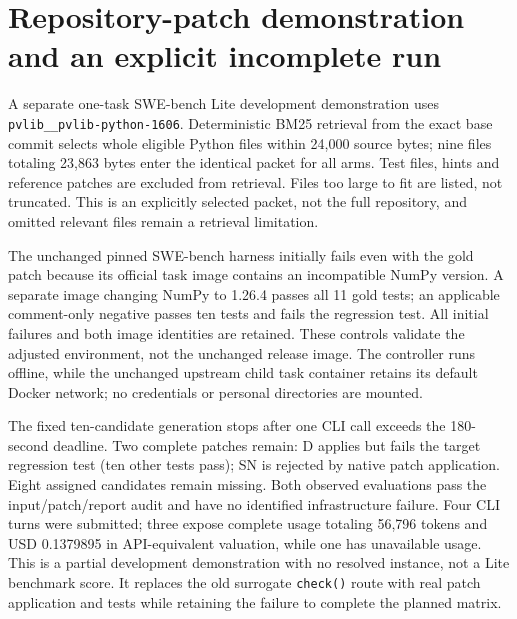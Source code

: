 \section{Repository-patch demonstration and an explicit incomplete run}
\label{sec:swe-dev1}

A separate one-task SWE-bench Lite development demonstration uses \texttt{pvlib\_\_pvlib-python-1606}. Deterministic BM25 retrieval from the exact base commit selects whole eligible Python files within 24,000 source bytes; nine files totaling 23,863 bytes enter the identical packet for all arms. Test files, hints and reference patches are excluded from retrieval. Files too large to fit are listed, not truncated. This is an explicitly selected packet, not the full repository, and omitted relevant files remain a retrieval limitation.

The unchanged pinned SWE-bench harness initially fails even with the gold patch because its official task image contains an incompatible NumPy version. A separate image changing NumPy to 1.26.4 passes all 11 gold tests; an applicable comment-only negative passes ten tests and fails the regression test. All initial failures and both image identities are retained. These controls validate the adjusted environment, not the unchanged release image. The controller runs offline, while the unchanged upstream child task container retains its default Docker network; no credentials or personal directories are mounted.

The fixed ten-candidate generation stops after one CLI call exceeds the 180-second deadline. Two complete patches remain: D applies but fails the target regression test (ten other tests pass); SN is rejected by native patch application. Eight assigned candidates remain missing. Both observed evaluations pass the input/patch/report audit and have no identified infrastructure failure. Four CLI turns were submitted; three expose complete usage totaling 56,796 tokens and USD 0.1379895 in API-equivalent valuation, while one has unavailable usage. This is a partial development demonstration with no resolved instance, not a Lite benchmark score. It replaces the old surrogate \texttt{check()} route with real patch application and tests while retaining the failure to complete the planned matrix.

